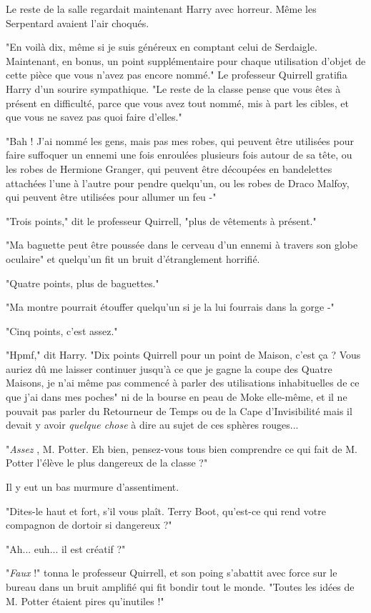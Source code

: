 Le reste de la salle regardait maintenant Harry avec horreur. Même les Serpentard avaient l'air choqués.

"En voilà dix, même si je suis généreux en comptant celui de Serdaigle. Maintenant, en bonus, un point supplémentaire pour chaque utilisation d'objet de cette pièce que vous n'avez pas encore nommé." Le professeur Quirrell gratifia Harry d'un sourire sympathique. "Le reste de la classe pense que vous êtes à présent en difficulté, parce que vous avez tout nommé, mis à part les cibles, et que vous ne savez pas quoi faire d'elles."

"Bah ! J'ai nommé les gens, mais pas mes robes, qui peuvent être utilisées pour faire suffoquer un ennemi une fois enroulées plusieurs fois autour de sa tête, ou les robes de Hermione Granger, qui peuvent être découpées en bandelettes attachées l'une à l'autre pour pendre quelqu'un, ou les robes de Draco Malfoy, qui peuvent être utilisées pour allumer un feu -"

"Trois points," dit le professeur Quirrell, "plus de vêtements à présent."

"Ma baguette peut être poussée dans le cerveau d'un ennemi à travers son globe oculaire" et quelqu'un fit un bruit d'étranglement horrifié.

"Quatre points, plus de baguettes."

"Ma montre pourrait étouffer quelqu'un si je la lui fourrais dans la gorge -"

"Cinq points, c'est assez."

"Hpmf," dit Harry. "Dix points Quirrell pour un point de Maison, c'est ça ? Vous auriez dû me laisser continuer jusqu'à ce que je gagne la coupe des Quatre Maisons, je n'ai même pas commencé à parler des utilisations inhabituelles de ce que j'ai dans mes poches" ni de la bourse en peau de Moke elle-même, et il ne pouvait pas parler du Retourneur de Temps ou de la Cape d'Invisibilité mais il devait y avoir \emph{quelque chose}  à dire au sujet de ces sphères rouges...

"\emph{Assez} , M. Potter. Eh bien, pensez-vous tous bien comprendre ce qui fait de M. Potter l'élève le plus dangereux de la classe ?"

Il y eut un bas murmure d'assentiment.

"Dites-le haut et fort, s'il vous plaît. Terry Boot, qu'est-ce qui rend votre compagnon de dortoir si dangereux ?"

"Ah... euh... il est créatif ?"

"\emph{Faux}  !" tonna le professeur Quirrell, et son poing s'abattit avec force sur le bureau dans un bruit amplifié qui fit bondir tout le monde. "Toutes les idées de M. Potter étaient pires qu'inutiles !"

